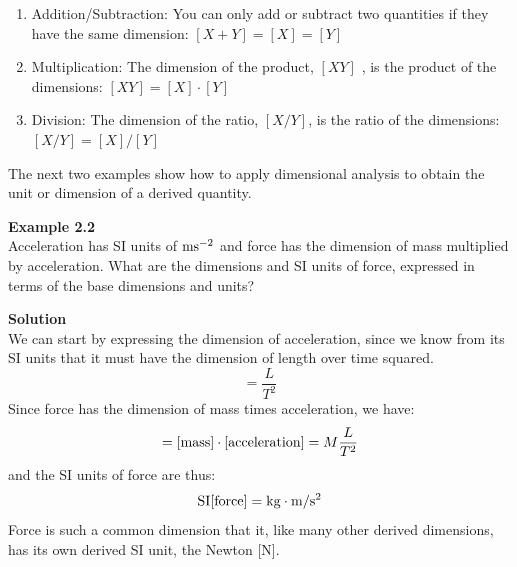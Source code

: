 \begin{enumerate}
\item Addition/Subtraction: You can only add or subtract two quantities if they have the same dimension: $[X+Y]=[X]=[Y]$
\item Multiplication: The dimension of the product, $[XY]$ , is the product of the dimensions: $[XY]=[X]\cdot[Y]$
\item Division: The dimension of the ratio, $[X/Y]$, is the ratio of the dimensions: $[X/Y]=[X]/[Y]$
\end{enumerate}

The next two examples show how to apply dimensional analysis to obtain the unit or dimension of a derived quantity.

\begin{framed}
\textbf{Example 2.2}\\
Acceleration has SI units of ${\rm ms^{ -2}}$ and force has the dimension of mass multiplied by acceleration. What are the dimensions and SI units of force, expressed in terms of the base dimensions and units?

\begin{framed}
\textbf{Solution}\\
We can start by expressing the dimension of acceleration, since we know from its SI units that it must have the dimension of length over time squared.
\begin{equation}
[{\rm acceleration}] = \frac{L}{T^2}
\end{equation}
Since force has the dimension of mass times acceleration, we have:
\begin{equation}
[{\rm force}] = [{\rm mass}]\cdot[{\rm acceleration}] = M \frac{L}{T^2}
\end{equation}
and the SI units of force are thus:
\begin{equation}
{\rm SI[force]} = {\rm kg}\cdot{\rm m/s^2}
\end{equation}
Force is such a common dimension that it, like many other derived dimensions, has its own derived SI unit, the Newton [N].
\end{framed}
\end{framed}

